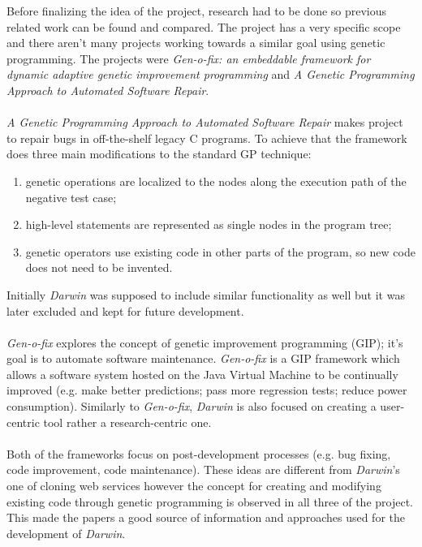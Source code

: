Before finalizing the idea of the project, research had to be done so previous related work can be found and compared. The project has a very
specific scope and there aren't many projects working towards a similar goal using genetic programming. The projects were
\textit{Gen-o-fix: an embeddable framework for dynamic adaptive genetic improvement programming} and \textit{A Genetic Programming Approach to
Automated Software Repair}\cite{softrepair}.
\paragraph{}
\textit{A Genetic Programming Approach to Automated Software Repair} makes project to repair bugs in off-the-shelf legacy C programs.
To achieve that the framework does three main modifications to the standard GP technique:
\begin{enumerate} 
\item genetic operations are localized to the nodes along the execution path of the negative test case; 
\item high-level statements are represented as single nodes in the program tree;
\item genetic operators use existing code in other parts of the program, so new code does not need to be invented.
\end{enumerate}
 Initially \textit{Darwin} was supposed to include similar functionality as well but it was later excluded and kept for future development.
\paragraph{}
\textit{Gen-o-fix} explores the concept of  genetic improvement programming (GIP); it's goal is to automate software
maintenance. \textit{Gen-o-fix} is a GIP framework which allows a software system hosted on the Java Virtual Machine to be continually improved
(e.g. make better predictions; pass more regression tests; reduce power consumption). Similarly to \textit{Gen-o-fix},
\textit{Darwin} is also focused on creating a user-centric tool rather a research-centric one.
\paragraph{}
Both of the frameworks focus on post-development processes (e.g. bug fixing, code improvement, code maintenance). These ideas are different
from \textit{Darwin}'s one of cloning web services however the concept for creating and modifying existing code through genetic programming is observed
in all three of the project. This made the papers a good source of information and approaches used for the development of \textit{Darwin}.